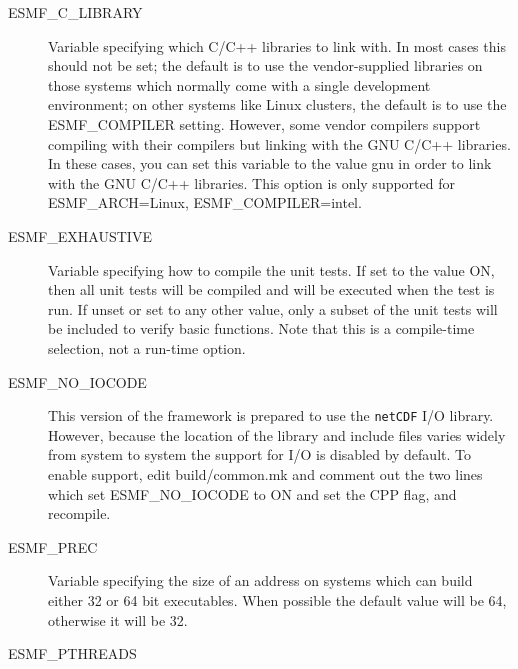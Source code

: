 \begin{description}
\item[ESMF\_C\_LIBRARY]

Variable specifying which C/C++ libraries to link with.  In most cases
this should not be set; the default is to use the vendor-supplied
libraries on those systems which normally come with a single
development environment; on other systems like Linux clusters,
the default is to use the ESMF\_COMPILER setting.  However, some
vendor compilers support compiling with their compilers but linking
with the GNU C/C++ libraries.
In these cases, you can set this variable
to the value gnu in order to link with the GNU C/C++ libraries.
This option is only supported for ESMF\_ARCH=Linux, ESMF\_COMPILER=intel.

\item[ESMF\_EXHAUSTIVE] 

Variable specifying how to compile the unit tests.
If set to the value ON, then all unit tests will be compiled
and will be executed when the test is run.  If unset or set 
to any other value, only a subset of the unit tests will 
be included to verify basic functions.  Note that this
is a compile-time selection, not a run-time option.

\item[ESMF\_NO\_IOCODE] 

This version of the framework is prepared to use the {\tt netCDF} I/O
library.  However, because the location of the library and include files
varies widely from system to system the support for I/O is disabled by
default.  To enable support, edit build/common.mk and comment out the two
lines which set ESMF\_NO\_IOCODE to ON and set the CPP flag, and recompile.

\item[ESMF\_PREC] 

Variable specifying the size of an address on systems which can build
either 32 or 64 bit executables.  When possible the default value will be
64, otherwise it will be 32.

\item[ESMF\_PTHREADS]


\end{description}
